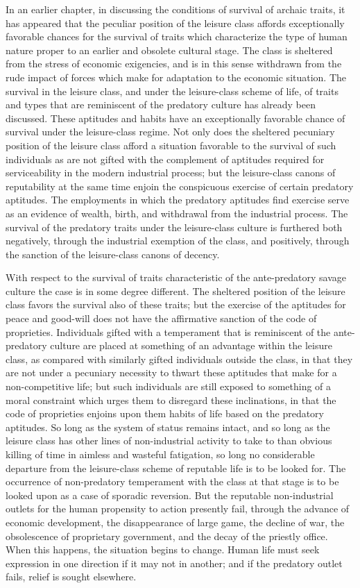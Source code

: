 \documentclass[12pt]{report}
\begin{document}
In an earlier chapter, in discussing the conditions of survival of
archaic traits, it has appeared that the peculiar position of the
leisure class affords exceptionally favorable chances for the survival
of traits which characterize the type of human nature proper to an
earlier and obsolete cultural stage. The class is sheltered from the
stress of economic exigencies, and is in this sense withdrawn from
the rude impact of forces which make for adaptation to the economic
situation. The survival in the leisure class, and under the
leisure-class scheme of life, of traits and types that are reminiscent
of the predatory culture has already been discussed. These aptitudes
and habits have an exceptionally favorable chance of survival under the
leisure-class regime. Not only does the sheltered pecuniary position of
the leisure class afford a situation favorable to the survival of such
individuals as are not gifted with the complement of aptitudes
required for serviceability in the modern industrial process; but
the leisure-class canons of reputability at the same time enjoin the
conspicuous exercise of certain predatory aptitudes. The employments
in which the predatory aptitudes find exercise serve as an evidence of
wealth, birth, and withdrawal from the industrial process. The survival
of the predatory traits under the leisure-class culture is furthered
both negatively, through the industrial exemption of the class, and
positively, through the sanction of the leisure-class canons of decency.

With respect to the survival of traits characteristic of the
ante-predatory savage culture the case is in some degree different.
The sheltered position of the leisure class favors the survival also of
these traits; but the exercise of the aptitudes for peace and good-will
does not have the affirmative sanction of the code of proprieties.
Individuals gifted with a temperament that is reminiscent of the
ante-predatory culture are placed at something of an advantage within
the leisure class, as compared with similarly gifted individuals outside
the class, in that they are not under a pecuniary necessity to
thwart these aptitudes that make for a non-competitive life; but such
individuals are still exposed to something of a moral constraint
which urges them to disregard these inclinations, in that the code of
proprieties enjoins upon them habits of life based on the predatory
aptitudes. So long as the system of status remains intact, and so long
as the leisure class has other lines of non-industrial activity to take
to than obvious killing of time in aimless and wasteful fatigation,
so long no considerable departure from the leisure-class scheme of
reputable life is to be looked for. The occurrence of non-predatory
temperament with the class at that stage is to be looked upon as a case
of sporadic reversion. But the reputable non-industrial outlets for
the human propensity to action presently fail, through the advance of
economic development, the disappearance of large game, the decline of
war, the obsolescence of proprietary government, and the decay of the
priestly office. When this happens, the situation begins to change.
Human life must seek expression in one direction if it may not in
another; and if the predatory outlet fails, relief is sought elsewhere.
\end{document}
